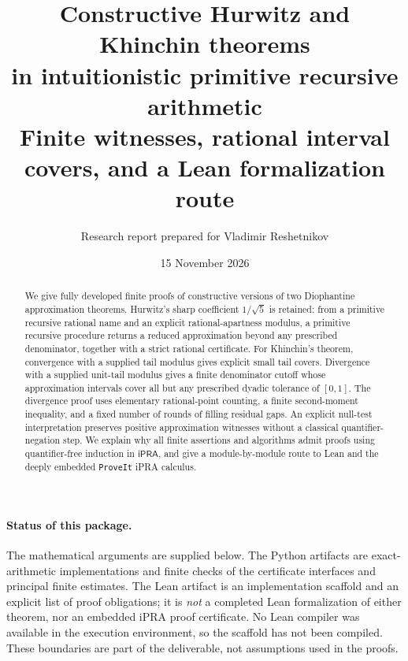 \documentclass[11pt,a4paper]{article}
\title{\vspace{-12mm}\textbf{Constructive Hurwitz and Khinchin theorems\\in intuitionistic primitive recursive arithmetic}\\[5pt]\large Finite witnesses, rational interval covers, and a Lean formalization route}
\author{Research report prepared for Vladimir Reshetnikov}
\date{15 November 2026}
\theoremstyle{definition}
\newcommand{\ipra}{\mathsf{iPRA}}
\newcommand{\repo}{\texttt{ProveIt}}
\begin{document}
\maketitle
\begin{abstract}
We give fully developed finite proofs of constructive versions of two
Diophantine approximation theorems.  Hurwitz's sharp coefficient
$1/\sqrt5$ is retained: from a primitive recursive rational name and an
explicit rational-apartness modulus, a primitive recursive procedure
returns a reduced approximation beyond any prescribed denominator,
together with a strict rational certificate.  For Khinchin's theorem,
convergence with a supplied tail modulus gives explicit small tail covers.
Divergence with a supplied unit-tail modulus gives a finite denominator
cutoff whose approximation intervals cover all but any prescribed dyadic
tolerance of $[0,1]$.  The divergence proof uses elementary rational-point
counting, a finite second-moment inequality, and a fixed number of rounds
of filling residual gaps.  An explicit null-test interpretation preserves
positive approximation witnesses without a classical quantifier-negation
step.  We explain why all finite assertions and algorithms admit proofs
using quantifier-free induction in $\ipra$, and give a module-by-module
route to Lean and the deeply embedded \repo{} iPRA calculus.
\end{abstract}

\paragraph{Status of this package.}
The mathematical arguments are supplied below.  The Python artifacts are
exact-arithmetic implementations and finite checks of the certificate
interfaces and principal finite estimates.  The Lean artifact is an
implementation scaffold and an explicit list of proof obligations; it is
\emph{not} a completed Lean formalization of either theorem, nor an
embedded iPRA proof certificate.  No Lean compiler was available in the
execution environment, so the scaffold has not been compiled.  These
boundaries are part of the deliverable, not assumptions used in the proofs.

\clearpage
\tableofcontents
\clearpage






\end{document}
